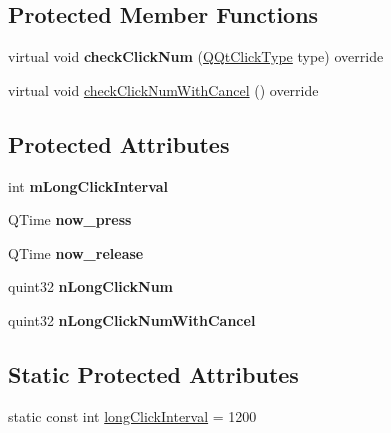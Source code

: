\subsection*{Protected Member Functions}
\begin{DoxyCompactItemize}
\item 
\mbox{\label{class_q_qt_long_click_helper_a49e0ebcf8d3dc878be0930ad765cc652}} 
virtual void {\bfseries check\+Click\+Num} (\mbox{\hyperlink{class_q_qt_virtual_click_helper_ace6c0c9b072e51f2cb3ff1316404b764}{Q\+Qt\+Click\+Type}} type) override
\item 
virtual void \mbox{\hyperlink{class_q_qt_long_click_helper_a9cc68a8b81d6ffe142509cdb31db78b1}{check\+Click\+Num\+With\+Cancel}} () override
\end{DoxyCompactItemize}
\subsection*{Protected Attributes}
\begin{DoxyCompactItemize}
\item 
\mbox{\label{class_q_qt_long_click_helper_ad9a0a112d65888e6724b4cfa006f61f5}} 
int {\bfseries m\+Long\+Click\+Interval}
\item 
\mbox{\label{class_q_qt_long_click_helper_a507dd42799a8c7ba2a840ffa9e2dbd44}} 
Q\+Time {\bfseries now\+\_\+press}
\item 
\mbox{\label{class_q_qt_long_click_helper_af8ba8a4ce62242ef90eff745731c7101}} 
Q\+Time {\bfseries now\+\_\+release}
\item 
\mbox{\label{class_q_qt_long_click_helper_ad0eb27eb44337df4deb7fee439e04d1a}} 
quint32 {\bfseries n\+Long\+Click\+Num}
\item 
\mbox{\label{class_q_qt_long_click_helper_a2d18b5633d517358a0a31f2fefb2bfda}} 
quint32 {\bfseries n\+Long\+Click\+Num\+With\+Cancel}
\end{DoxyCompactItemize}
\subsection*{Static Protected Attributes}
\begin{DoxyCompactItemize}
\item 
static const int \mbox{\hyperlink{class_q_qt_long_click_helper_aae392691a102b1b7de765494bc5e6946}{long\+Click\+Interval}} = 1200
\end{DoxyCompactItemize}
